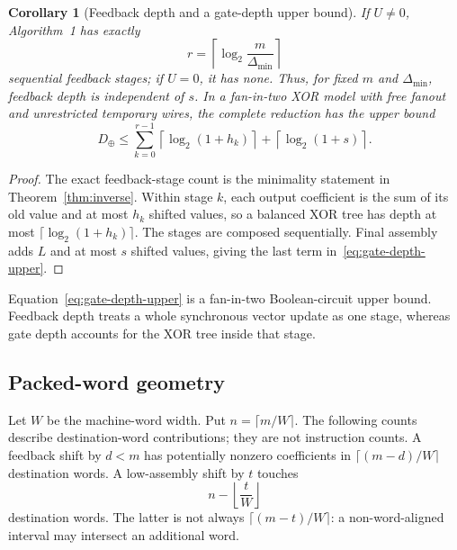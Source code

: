 \documentclass{mcom-l}
\numberwithin{equation}{section}
\newtheorem{corollary}[theorem]{Corollary}
\theoremstyle{definition}
\theoremstyle{remark}
\newcommand{\Dmin}{\Delta_{\min}}
\begin{document}
\begin{corollary}[Feedback depth and a gate-depth upper bound]
\label{cor:depth}
If $U\ne0$, Algorithm~1 has exactly
\[
  r=\left\lceil\log_2\frac{m}{\Dmin}\right\rceil
\]
sequential feedback stages; if $U=0$, it has none.  Thus, for fixed $m$ and
$\Dmin$, feedback depth is independent of $s$.  In a fan-in-two XOR model
with free fanout and unrestricted temporary wires, the complete reduction has
the upper bound
\begin{equation}
  D_\oplus
  \le\sum_{k=0}^{r-1}\left\lceil\log_2(1+h_k)\right\rceil
    +\left\lceil\log_2(1+s)\right\rceil .
  \label{eq:gate-depth-upper}
\end{equation}
\end{corollary}
\begin{proof}
The exact feedback-stage count is the minimality statement in
Theorem~\ref{thm:inverse}.  Within stage $k$, each output coefficient is the
sum of its old value and at most $h_k$ shifted values, so a balanced XOR tree
has depth at most $\lceil\log_2(1+h_k)\rceil$.  The stages are composed
sequentially.  Final assembly adds $L$ and at most $s$ shifted values, giving
the last term in~\eqref{eq:gate-depth-upper}.
\end{proof}

Equation~\eqref{eq:gate-depth-upper} is a fan-in-two Boolean-circuit upper
bound. Feedback depth treats a whole synchronous vector update as one stage,
whereas gate depth accounts for the XOR tree inside that stage.

\subsection{Packed-word geometry}

Let $W$ be the machine-word width.  Put $n=\lceil m/W\rceil$.  The following
counts describe destination-word contributions; they are not instruction
counts.  A feedback shift by $d<m$ has potentially nonzero coefficients in
$\lceil(m-d)/W\rceil$ destination words.  A low-assembly shift by $t$ touches
\[
  n-\left\lfloor\frac{t}{W}\right\rfloor
\]
destination words.  The latter is not always
$\lceil(m-t)/W\rceil$: a non-word-aligned interval may intersect an additional
word.
\end{document}
